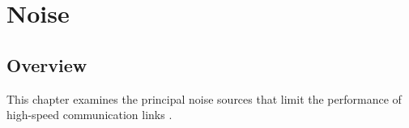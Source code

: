 \chapter{Noise}

\section{Overview}

This chapter examines the principal noise sources that limit
the performance of high-speed communication links
\citep{palermo2025ecen720}.





